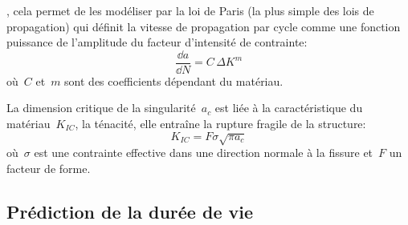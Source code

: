 \medskip
{}, cela permet de les modéliser par la loi de Paris (la plus simple des lois de propagation) qui définit la vitesse de propagation par cycle comme une fonction puissance de l'amplitude du facteur d'intensité de contrainte:
\begin{equation} \dfrac{\dd a}{\dd N} = C\,\Delta K^m \end{equation}
où~$C$ et~$m$ sont des coefficients dépendant du matériau.

La dimension critique de la singularité~$a_c$ est liée à la caractéristique du matériau~$K_{IC}$, la ténacité, elle entraîne la rupture fragile de la structure: 
\begin{equation} K_{IC} = F \sigma \sqrt{\pi a_c} \end{equation}
où~$\sigma$ est une contrainte effective dans une direction normale à la fissure et~$F$ un facteur de forme.




\medskip
\subsection{Prédiction de la durée de vie}

